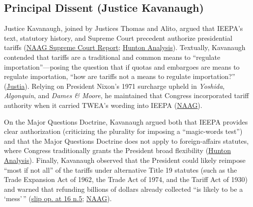 \documentclass[12pt]{article}
\begin{document}
\subsection{Principal Dissent (Justice Kavanaugh)}
Justice Kavanaugh, joined by Justices Thomas and Alito, argued that IEEPA's text, statutory history, and Supreme Court precedent authorize presidential tariffs (\href{https://www.naag.org/attorney-general-journal/supreme-court-report-volume-33-issue-7/}{NAAG Supreme Court Report}; \href{https://www.hunton.com/insights/legal/major-questions-remain-about-the-major-questions-doctrine}{Hunton Analysis}). Textually, Kavanaugh contended that tariffs are a traditional and common means to ``regulate importation''---posing the question that if quotas and embargoes are means to regulate importation, ``how are tariffs not a means to regulate importation?'' (\href{https://supreme.justia.com/cases/federal/us/607/24-1287/}{Justia}). Relying on President Nixon's 1971 surcharge upheld in \textit{Yoshida}, \textit{Algonquin}, and \textit{Dames \& Moore}, he maintained that Congress incorporated tariff authority when it carried TWEA's wording into IEEPA (\href{https://www.naag.org/attorney-general-journal/supreme-court-report-volume-33-issue-7/}{NAAG}).

On the Major Questions Doctrine, Kavanaugh argued both that IEEPA provides clear authorization (criticizing the plurality for imposing a ``magic-words test'') and that the Major Questions Doctrine does not apply to foreign-affairs statutes, where Congress traditionally grants the President broad flexibility (\href{https://www.hunton.com/insights/legal/major-questions-remain-about-the-major-questions-doctrine}{Hunton Analysis}). Finally, Kavanaugh observed that the President could likely reimpose ``most if not all'' of the tariffs under alternative Title 19 statutes (such as the Trade Expansion Act of 1962, the Trade Act of 1974, and the Tariff Act of 1930) and warned that refunding billions of dollars already collected ``is likely to be a `mess'\,'' (\href{https://www.law.cornell.edu/supremecourt/text/24-1287}{slip op. at 16 n.5}; \href{https://www.naag.org/attorney-general-journal/supreme-court-report-volume-33-issue-7/}{NAAG}).
\end{document}
